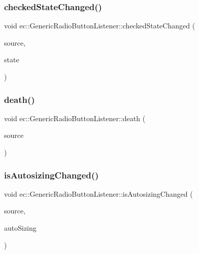\subsubsection{\texorpdfstring{checked\+State\+Changed()}{checkedStateChanged()}}
{\footnotesize\ttfamily void ec\+::\+Generic\+Radio\+Button\+Listener\+::checked\+State\+Changed (\begin{DoxyParamCaption}\item[{agui\+::\+Radio\+Button $\ast$}]{source,  }\item[{agui\+::\+Radio\+Button\+::\+Radio\+Button\+Checked\+Enum}]{state }\end{DoxyParamCaption})\hspace{0.3cm}{\ttfamily [override]}}

\mbox{\label{classec_1_1_generic_radio_button_listener_ab5fee70ab046379a87fd047a77de64df}} 
\subsubsection{\texorpdfstring{death()}{death()}}
{\footnotesize\ttfamily void ec\+::\+Generic\+Radio\+Button\+Listener\+::death (\begin{DoxyParamCaption}\item[{agui\+::\+Radio\+Button $\ast$}]{source }\end{DoxyParamCaption})\hspace{0.3cm}{\ttfamily [override]}}

\mbox{\label{classec_1_1_generic_radio_button_listener_a41958342697556ad6aad28d03bbd1d51}} 
\subsubsection{\texorpdfstring{is\+Autosizing\+Changed()}{isAutosizingChanged()}}
{\footnotesize\ttfamily void ec\+::\+Generic\+Radio\+Button\+Listener\+::is\+Autosizing\+Changed (\begin{DoxyParamCaption}\item[{agui\+::\+Radio\+Button $\ast$}]{source,  }\item[{bool}]{auto\+Sizing }\end{DoxyParamCaption})\hspace{0.3cm}{\ttfamily [override]}}

